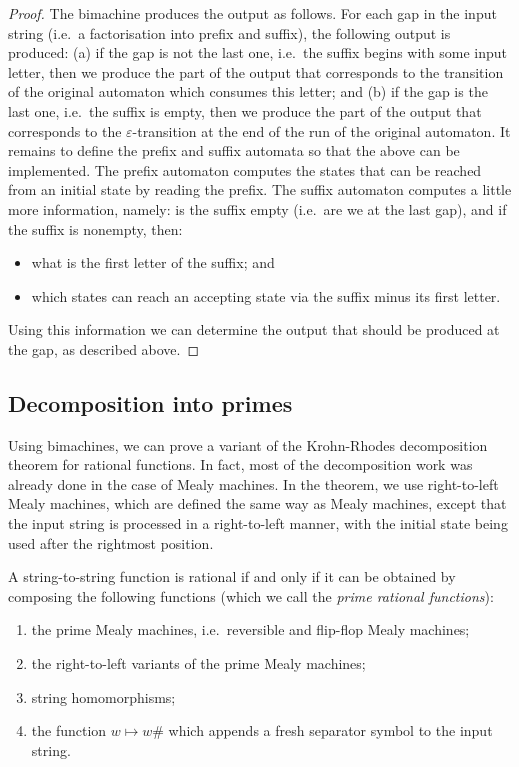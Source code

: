 \begin{proof}
The bimachine produces the output as follows. For each gap in the input string (i.e.~a factorisation into prefix and suffix), the following output is produced: (a) if the gap is not the last one, i.e.~the suffix begins with some input letter, then we produce the part of the output that corresponds to the transition of the original automaton which consumes this letter; and (b) if the gap is the last one, i.e.~the suffix is empty, then we produce the part of the output that corresponds to the $\varepsilon$-transition at the end of the run of the original automaton. It remains to define the prefix and suffix automata so that the above can be implemented.  The prefix automaton computes the states that can be reached from an initial state by reading the prefix. The suffix automaton computes a little more information, namely: is the suffix empty (i.e.~are we at the last gap), and if the suffix is nonempty, then: 
    \begin{itemize}
        \item what is the first  letter of the suffix; and
        \item which states can reach an accepting state via the suffix minus its first letter.   
    \end{itemize}
Using this information we can determine the output that should be produced at the gap, as described above.
\end{proof}


\subsection{Decomposition into primes}
\label{sec:rational-primes}
 Using bimachines, we can prove a variant of the Krohn-Rhodes decomposition theorem for rational functions. In fact, most of the decomposition work was already done in the case of Mealy machines. In the theorem, we use right-to-left Mealy machines, which are defined the same way as Mealy machines, except that the input string is processed in a right-to-left manner, with the initial state being used after the rightmost position.
\begin{theorem}\label{thm:rational-primes}
    A string-to-string function is rational if and only if it can be obtained by composing the following functions (which we call the \emph{prime rational functions}): 
    \begin{enumerate}
        \item the prime Mealy machines, i.e.~reversible and flip-flop Mealy machines;
        \item the right-to-left variants of the prime Mealy machines;
        \item string homomorphisms;
        \item the function $w \mapsto w\#$ which appends a fresh separator symbol to the input string.
    \end{enumerate}
\end{theorem}

